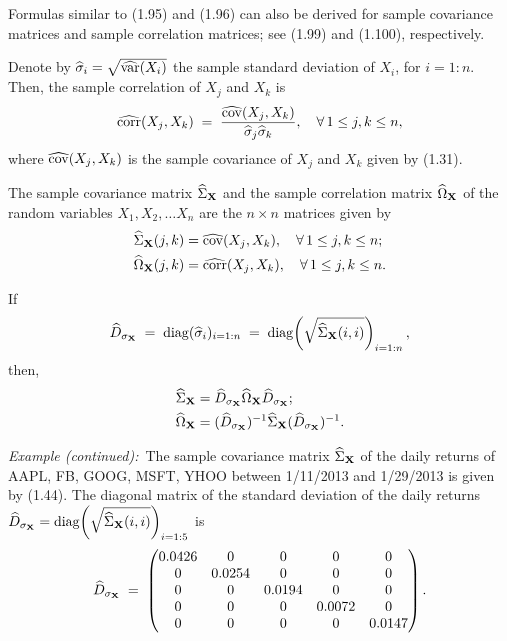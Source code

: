 Formulas similar to (1.95) and (1.96) can also be derived for sample
covariance matrices and sample correlation matrices; see (1.99) and
(1.100), respectively.

Denote by $\widehat{\sigma}_i=\sqrt{\widehat{\operatorname{var}}(X_i)}$ the sample
standard deviation of $X_i$, for $i=1:n$. Then, the sample correlation of
$X_j$ and $X_k$ is
\[
\widehat{\operatorname{corr}}(X_j,X_k) \;=\; \frac{\widehat{\operatorname{cov}}(X_j,X_k)}{\widehat{\sigma}_j\widehat{\sigma}_k}, \quad \forall\, 1\le j,k\le n,
\]
where $\widehat{\operatorname{cov}}(X_j,X_k)$ is the sample covariance of $X_j$ and
$X_k$ given by (1.31).

The sample covariance matrix $\widehat{\Sigma}_{\mathbf{X}}$ and the sample
correlation matrix $\widehat{\Omega}_{\mathbf{X}}$ of the random variables
$X_1,X_2,\ldots X_n$ are the $n\times n$ matrices given by
\begin{align*}
\widehat{\Sigma}_{\mathbf{X}}(j,k) &= \widehat{\operatorname{cov}}(X_j,X_k), \quad \forall\, 1\le j,k\le n; \\
\widehat{\Omega}_{\mathbf{X}}(j,k) &= \widehat{\operatorname{corr}}(X_j,X_k), \quad \forall\, 1\le j,k\le n.
\end{align*}

If
\begin{equation}
\widehat{D}_{\sigma_{\mathbf{X}}} \;=\; \operatorname{diag}(\widehat{\sigma}_i)_{i=1:n} \;=\; \operatorname{diag}\!\left(\sqrt{\widehat{\Sigma}_{\mathbf{X}}(i,i)}\right)_{i=1:n},
\end{equation}
then,
\begin{align}
\widehat{\Sigma}_{\mathbf{X}} &= \widehat{D}_{\sigma_{\mathbf{X}}}\widehat{\Omega}_{\mathbf{X}}\widehat{D}_{\sigma_{\mathbf{X}}}; \\
\widehat{\Omega}_{\mathbf{X}} &= (\widehat{D}_{\sigma_{\mathbf{X}}})^{-1}\widehat{\Sigma}_{\mathbf{X}}(\widehat{D}_{\sigma_{\mathbf{X}}})^{-1}.
\end{align}

\par\medskip\noindent\textit{Example (continued):}\
The sample covariance matrix $\widehat{\Sigma}_{\mathbf{X}}$ of the daily
returns of AAPL, FB, GOOG, MSFT, YHOO between 1/11/2013 and 1/29/2013 is
given by (1.44). The diagonal matrix of the standard deviation of the
daily returns
$\widehat{D}_{\sigma_{\mathbf{X}}}=\operatorname{diag}\!\left(\sqrt{\widehat{\Sigma}_{\mathbf{X}}(i,i)}\right)_{i=1:5}$
is
\begin{equation}
\widehat{D}_{\sigma_{\mathbf{X}}} \;=\;
\begin{pmatrix}
0.0426 & 0 & 0 & 0 & 0 \\
0 & 0.0254 & 0 & 0 & 0 \\
0 & 0 & 0.0194 & 0 & 0 \\
0 & 0 & 0 & 0.0072 & 0 \\
0 & 0 & 0 & 0 & 0.0147
\end{pmatrix}.
\end{equation}

